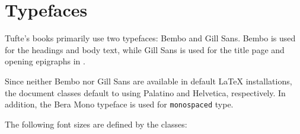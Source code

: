 \documentclass[
  letterpaper,
  DIV=11,
  numbers=noendperiod]{scrartcl}
\begin{document}
\begin{figure}[p]
\hfill
{}
\end{figure}

\section{Typefaces}\label{sec:typefaces1}

 

Tufte's books primarily use two typefaces: Bembo and Gill Sans. Bembo is
used for the headings and body text, while Gill Sans is used for the
title page and opening epigraphs in \BE.

Since neither Bembo nor Gill Sans are available in default \LaTeX{}
installations, the \TL document classes default to using Palatino and
Helvetica, respectively. In addition, the Bera Mono typeface is used for
\texttt{monospaced} type.

The following font sizes are defined by the \TL classes:
\end{document}
